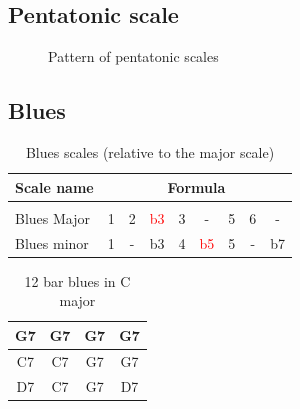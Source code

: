 \documentclass{article}
\begin{document}
\newpage
\subsection{Pentatonic scale}
\begin{figure}[h!]
	\centering
	\hspace*{-2cm}
	\scalebox{0.5}{}
	\caption{Pattern of pentatonic scales}
	\label{fig:gammme_penta_manche}
\end{figure}

\newpage
\subsection{Blues}


\begin{table}[!h]
	\caption{Blues scales (relative to the major scale)}
	\centering
	\begin{tabular}{l|cccccccc}
		Scale name  & \multicolumn{8}{c}{Formula} \\
		\hline \hline \vspace{-0.4cm} \\
		Blues Major   & 1 & 2  & \textcolor{red}{b3} & 3  &   -   & 5  & 6  &  -  \\
		Blues minor   & 1 &  - & b3 & 4  & \textcolor{red}{b5} &  5  & - &  b7 \\
	\end{tabular}
	\label{tab: }
\end{table}

\begin{table}[!h]
	\caption{12 bar blues in C major}
	\centering
	\begin{tabular}{| c | c | c | c |}
		\hline
		\phantom{x}G7\phantom{x} & \phantom{x}G7\phantom{x} & \phantom{x}G7\phantom{x} & \phantom{x}G7\phantom{x}  \\
		\hline
		\phantom{x}C7\phantom{x} & \phantom{x}C7\phantom{x} & \phantom{x}G7\phantom{x} & \phantom{x}G7\phantom{x}  \\
		\hline
		\phantom{x}D7\phantom{x} & \phantom{x}C7\phantom{x} & \phantom{x}G7\phantom{x} & \phantom{x}D7\phantom{x}  \\
		\hline
	\end{tabular}
	\label{tab: }
\end{table}
\end{document}
